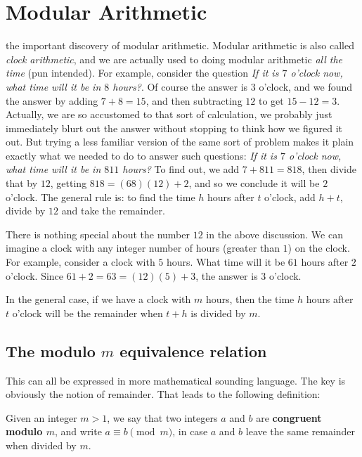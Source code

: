 \chapter{Modular Arithmetic}


 the important discovery of modular arithmetic. 
Modular arithmetic is also called {\itshape clock arithmetic}, and we
are actually used to doing modular arithmetic {\itshape all the time} (pun 
intended). For example,
consider the question {\itshape If it is $7$ o'clock now, what time
will it be in $8$ hours?}. Of course the answer is $3$ o'clock, and
we found the answer by adding $7+8 = 15$, and then subtracting $12$
to get $15-12=3$. Actually, we are so accustomed to that sort of calculation,
we probably just immediately blurt out the answer without stopping to think
how we figured it out. But trying a less familiar version of the same
sort of problem makes it plain exactly what we needed to do to answer such
questions: \textit{If it is $7$ o'clock now, what time
will it be in $811$ hours?} To find out, we add $7+811 = 818$, then divide
that by $12$, getting $818 = (68)(12) + 2$, and so we conclude it will
be $2$ o'clock. The general rule is: to  find the time $h$ hours after
$t$ o'clock, add $h+t$, divide by $12$ and take the remainder.

There is nothing special about the number $12$ in the above discussion. We can
imagine a clock with any integer number of hours (greater than $1$) on the clock.
For example, consider a clock with $5$ hours. What time will it be $61$ hours after
$2$ o'clock. Since $61+2 = 63 = (12)(5) + 3$, the answer is $3$ o'clock.

In the general case, if we have a clock with $m$ hours, then the time $h$ hours after
$t$ o'clock will be the remainder when $t+h$ is divided by $m$.

\section{The modulo $m$ equivalence relation}
This can all be expressed in more mathematical sounding language. The key is 
obviously the notion of remainder. That leads to the following definition:
\begin{defn}
Given an integer $m>1$, we say that two integers $a$ and $b$ are 
{\bfseries congruent 
modulo $m$}, and write $a\equiv b\pmod m$, in case $a$ and $b$ leave the same
remainder when divided by $m$.
\end{defn}



